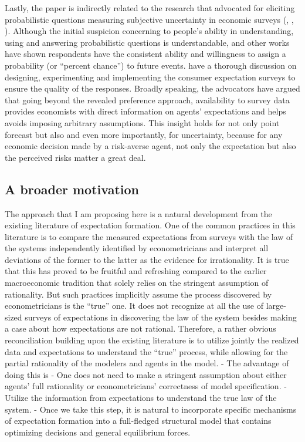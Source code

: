 \documentclass[12pt,notitlepage,onecolumn,aps,pra]{revtex4-1}
\begin{document}
Lastly, the paper is indirectly related to the research that advocated
for eliciting probabilistic questions measuring subjective uncertainty
in economic surveys (\cite{manski_measuring_2004},
\cite{delavande2011measuring}, \cite{manski_survey_2018}). Although the
initial suspicion concerning to people's ability in understanding, using
and answering probabilistic questions is understandable,
\cite{bertrand_people_2001} and other works have shown respondents have
the consistent ability and willingness to assign a probability (or
``percent chance'') to future events. \cite{armantier_overview_2017}
have a thorough discussion on designing, experimenting and implementing
the consumer expectation surveys to ensure the quality of the responses.
Broadly speaking, the advocators have argued that going beyond the
revealed preference approach, availability to survey data provides
economists with direct information on agents' expectations and helps
avoids imposing arbitrary assumptions. This insight holds for not only
point forecast but also and even more importantly, for uncertainty,
because for any economic decision made by a risk-averse agent, not only
the expectation but also the perceived risks matter a great deal.

\hypertarget{a-broader-motivation}{%
\subsection{A broader motivation}\label{a-broader-motivation}}

The approach that I am proposing here is a natural development from the
existing literature of expectation formation. One of the common
practices in this literature is to compare the measured expectations
from surveys with the law of the systems independently identified by
econometricians and interpret all deviations of the former to the latter
as the evidence for irrationality. It is true that this has proved to be
fruitful and refreshing compared to the earlier macroeconomic tradition
that solely relies on the stringent assumption of rationality. But such
practices implicitly assume the process discovered by econometricians is
the ``true'' one. It does not recognize at all the use of large-sized
surveys of expectations in discovering the law of the system besides
making a case about how expectations are not rational. Therefore, a
rather obvious reconciliation building upon the existing literature is
to utilize jointly the realized data and expectations to understand the
``true'' process, while allowing for the partial rationality of the
modelers and agents in the model. - The advantage of doing this is - One
does not need to make a stringent assumption about either agents' full
rationality or econometricians' correctness of model specification. -
Utilize the information from expectations to understand the true law of
the system. - Once we take this step, it is natural to incorporate
specific mechanisms of expectation formation into a full-fledged
structural model that contains optimizing decisions and general
equilibrium forces.
\end{document}
